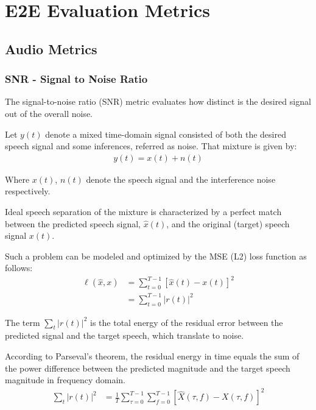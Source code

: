 \chapter{E2E Evaluation Metrics}
\section{Audio Metrics}
\subsection{SNR - Signal to Noise Ratio}
The signal-to-noise ratio (SNR) metric evaluates how
distinct is the desired signal out of the overall noise.

Let \(y(t)\) denote a mixed time-domain signal consisted of
both the desired speech signal and some inferences, referred as noise.
That mixture is given by:
\begin{align}
    y(t) = x(t) + n(t)
\end{align}

Where \(x(t)\), \(n(t)\) denote the speech signal and the
interference noise respectively.

Ideal speech separation of the mixture is characterized by
a perfect match between the predicted speech signal, \(\widehat{x}(t)\), 
and the original (target) speech signal \(x(t)\).

Such a problem can be modeled and optimized by the MSE (L2) loss function as follows:
\begin{align}
    \ell(\widehat{x}, x) & = \sum_{t=0}^{T-1} \left[\widehat{x}(t) - x(t)\right]^{2} \\
    & = \sum_{t=0}^{T-1} |r(t)|^{2}
\end{align}

The term \(\sum_{t} |r(t)|^{2}\) is the total energy of the residual error between 
the predicted signal and the target speech, which translate to noise.

According to Parseval's theorem, the residual energy in time equals the sum of
the power difference between the predicted magnitude and the target speech magnitude
in frequency domain.
\begin{align}
    \sum_{t} |r(t)|^{2} & = \frac{1}{T}\sum_{\tau=0}^{T-1}\sum_{f=0}^{T-1} \left[ \widehat{X}(\tau, f) - X(\tau, f)\right]^{2}
\end{align}

